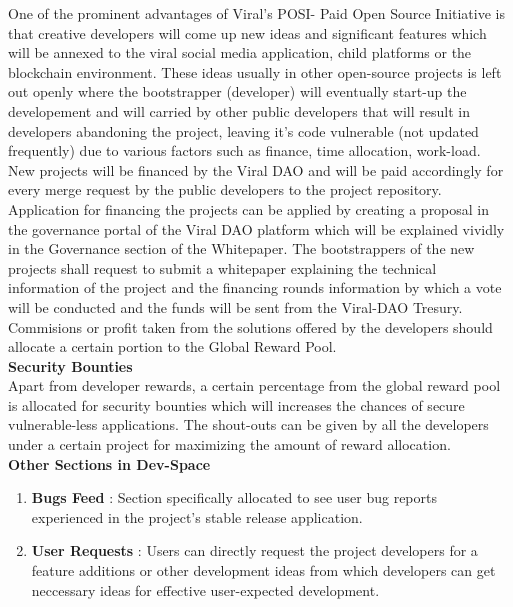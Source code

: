 \documentclass[conference]{IEEEtran}
\begin{document}
One of the prominent advantages of Viral's POSI- Paid Open Source Initiative is that creative developers will come up new ideas and significant features which will be annexed to the viral social media application, child platforms or the blockchain environment. These ideas usually in other open-source projects is left out openly where the bootstrapper (developer) will eventually start-up the developement and will carried by other public developers that will result in developers abandoning the project, leaving it's code vulnerable (not updated frequently) due to various factors such as finance, time allocation, work-load.  New projects will be financed by the Viral DAO and will be paid accordingly for every merge request by the public developers to the project repository. Application for financing the projects can be applied by creating a proposal in the governance portal of the Viral DAO platform which will be explained vividly in the Governance section of the Whitepaper. The bootstrappers of the new projects shall request to submit a whitepaper explaining the technical information of the project and the financing rounds information by which a vote will be conducted and the funds will be sent from the Viral-DAO Tresury. Commisions or profit taken from the solutions offered by the developers should allocate a certain portion to the Global Reward Pool. \\

\textbf{Security Bounties}\\

Apart from developer rewards, a certain percentage from the global reward pool is allocated for security bounties which will increases the chances of secure vulnerable-less applications. The shout-outs can be given by all the developers under a certain project for maximizing the amount of reward allocation.\\

\textbf{Other Sections in Dev-Space}
\begin{enumerate}[wide, labelwidth=!, labelindent=0pt]
\item \textbf{Bugs Feed} : Section specifically allocated to see user bug reports experienced in the project's stable release application.
\item \textbf{User Requests} : Users can directly request the project developers for a feature additions or other development ideas from which developers can get neccessary ideas for effective user-expected development.
\end{enumerate}
\end{document}
